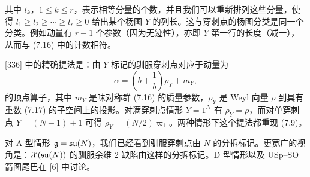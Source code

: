 其中 $l_k$，$1\le k\le r$，表示相等分量的个数，并且我们可以重新排列这些分量，使得 $l_1\ge l_2\ge\cdots\ge l_r\ge0$ 给出某个杨图 $Y$ 的列长。这与穿刺点的杨图分类是同一个分类。例如动量有 $r-1$ 个参数（因为无迹性），亦即 $Y$ 第一行的长度（减一），从而与 (7.16) 中的计数相符。

[336] 中的精确提法是：由 $Y$ 标记的驯服穿刺点对应于动量为
\begin{equation}
    \alpha=\left(b+\frac{1}{b}\right)\rho_Y+m_Y,
    \tag{7.18}
\end{equation}
的顶点算子，其中 $m_Y$ 是味对称群 (7.16) 的质量参数，$\rho_Y$ 是 Weyl 向量 $\rho$ 到具有重数 (7.17) 的子空间上的投影。对满穿刺点情形 $Y=1^N$ 有 $\rho_Y=\rho$，而对单穿刺点 $Y=(N-1)+1$ 可得 $\rho_Y=(N/2)\varpi_1$。两种情形下这个提法都重现 (7.9)。

 对 A 型情形 $\mathfrak{g}=\mathfrak{su}(N)$，我们已经看到驯服穿刺点由 $N$ 的分拆标记。更宽广的视角是：$\mathcal{X}(\mathfrak{su}(N))$ 的驯服余维 2 缺陷由这样的分拆标记。D 型情形以及 USp--SO 箭图尾巴在 [6] 中讨论。

